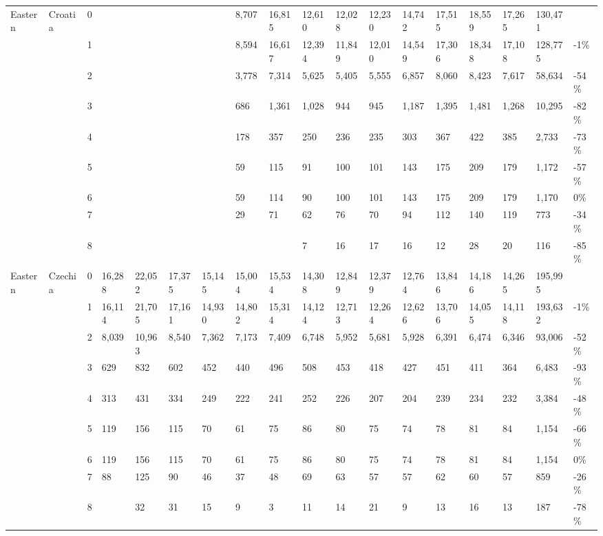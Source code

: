 \begin{longtable}{llllllllllllllllll}
  Eastern & Croatia & 0 &  &  &  &  & 8,707 & 16,815 & 12,610 & 12,028 & 12,230 & 14,742 & 17,515 & 18,559 & 17,265 & 130,471 &  \\ 
   &  & 1 &  &  &  &  & 8,594 & 16,617 & 12,394 & 11,849 & 12,010 & 14,549 & 17,306 & 18,348 & 17,108 & 128,775 & -1\% \\ 
   &  & 2 &  &  &  &  & 3,778 & 7,314 & 5,625 & 5,405 & 5,555 & 6,857 & 8,060 & 8,423 & 7,617 & 58,634 & -54\% \\ 
   &  & 3 &  &  &  &  & 686 & 1,361 & 1,028 & 944 & 945 & 1,187 & 1,395 & 1,481 & 1,268 & 10,295 & -82\% \\ 
   &  & 4 &  &  &  &  & 178 & 357 & 250 & 236 & 235 & 303 & 367 & 422 & 385 & 2,733 & -73\% \\ 
   &  & 5 &  &  &  &  & 59 & 115 & 91 & 100 & 101 & 143 & 175 & 209 & 179 & 1,172 & -57\% \\ 
   &  & 6 &  &  &  &  & 59 & 114 & 90 & 100 & 101 & 143 & 175 & 209 & 179 & 1,170 & 0\% \\ 
   &  & 7 &  &  &  &  & 29 & 71 & 62 & 76 & 70 & 94 & 112 & 140 & 119 & 773 & -34\% \\ 
   &  & 8 &  &  &  &  &  &  & 7 & 16 & 17 & 16 & 12 & 28 & 20 & 116 & -85\% \\ 
  Eastern & Czechia & 0 & 16,288 & 22,052 & 17,375 & 15,145 & 15,004 & 15,534 & 14,308 & 12,849 & 12,379 & 12,764 & 13,846 & 14,186 & 14,265 & 195,995 &  \\ 
   &  & 1 & 16,114 & 21,705 & 17,161 & 14,930 & 14,802 & 15,314 & 14,124 & 12,713 & 12,264 & 12,626 & 13,706 & 14,055 & 14,118 & 193,632 & -1\% \\ 
   &  & 2 & 8,039 & 10,963 & 8,540 & 7,362 & 7,173 & 7,409 & 6,748 & 5,952 & 5,681 & 5,928 & 6,391 & 6,474 & 6,346 & 93,006 & -52\% \\ 
   &  & 3 & 629 & 832 & 602 & 452 & 440 & 496 & 508 & 453 & 418 & 427 & 451 & 411 & 364 & 6,483 & -93\% \\ 
   &  & 4 & 313 & 431 & 334 & 249 & 222 & 241 & 252 & 226 & 207 & 204 & 239 & 234 & 232 & 3,384 & -48\% \\ 
   &  & 5 & 119 & 156 & 115 & 70 & 61 & 75 & 86 & 80 & 75 & 74 & 78 & 81 & 84 & 1,154 & -66\% \\ 
   &  & 6 & 119 & 156 & 115 & 70 & 61 & 75 & 86 & 80 & 75 & 74 & 78 & 81 & 84 & 1,154 & 0\% \\ 
   &  & 7 & 88 & 125 & 90 & 46 & 37 & 48 & 69 & 63 & 57 & 57 & 62 & 60 & 57 & 859 & -26\% \\ 
   &  & 8 &  & 32 & 31 & 15 & 9 & 3 & 11 & 14 & 21 & 9 & 13 & 16 & 13 & 187 & -78\% \\ 

\end{longtable}

